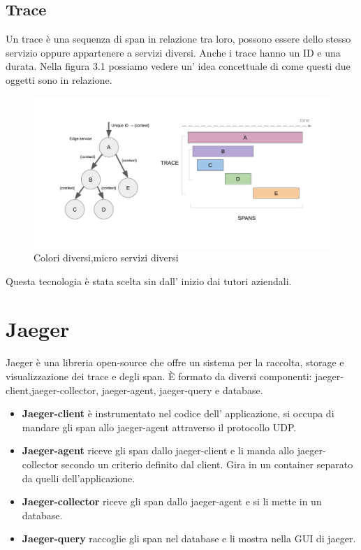\documentclass[a4paper,12pt,titlepage,italian,openany]{report}
\begin{document}
\subsection{Trace}
Un trace è una sequenza di span in relazione tra loro, possono essere dello stesso servizio oppure appartenere a servizi diversi. Anche i trace hanno un ID e una durata.
Nella figura 3.1 possiamo vedere un' idea concettuale di come questi due oggetti sono in relazione.

\begin{figure}[H]
    
    \includegraphics[scale=0.4]{1.png}
    \centering
    \caption{Colori diversi,micro servizi diversi}
\end{figure}
Questa tecnologia è stata scelta sin dall' inizio dai tutori aziendali.
\section{Jaeger}

Jaeger\cite{jaeger:1} è una libreria open-source che offre un sistema per la raccolta, storage e visualizzazione dei trace e degli span.
È formato da diversi componenti: jaeger-client,jaeger-collector, jaeger-agent, jaeger-query e database.
\begin{itemize}
    \item{\textbf{Jaeger-client}} è instrumentato nel codice dell' applicazione, si occupa di mandare gli span allo jaeger-agent attraverso il protocollo UDP.
    \item {\textbf{Jaeger-agent}} riceve gli span dallo jaeger-client e li manda allo jaeger-collector secondo un criterio definito dal client. Gira in un container separato da quelli dell'applicazione.
    \item {\textbf{Jaeger-collector}} riceve gli span dallo jaeger-agent e si li mette in un database.
    \item {\textbf{Jaeger-query}} raccoglie gli span nel database e li mostra nella GUI di jaeger.
\end{itemize}
\end{document}
